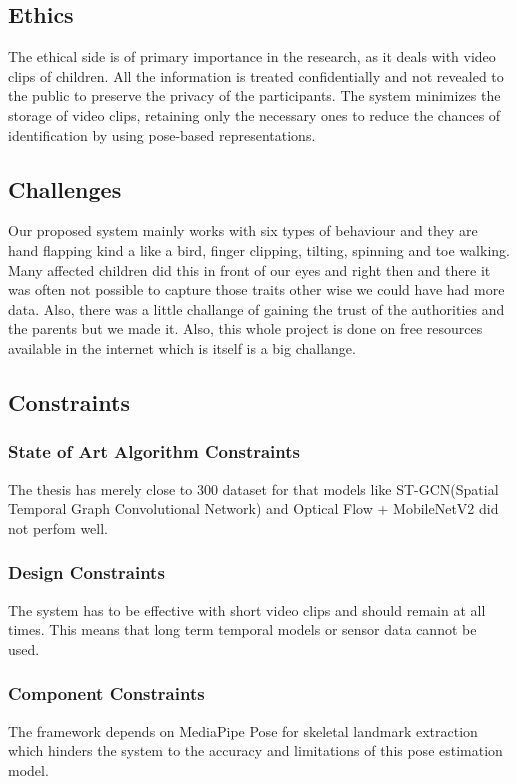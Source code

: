 \subsection{Ethics}

The ethical side is of primary importance in the research, as it deals with video clips of children. All the information is treated confidentially and not revealed to the public to preserve the privacy of the participants. The system minimizes the storage of video clips, retaining only the necessary ones to reduce the chances of identification by using pose-based representations.

\subsection{Challenges}

Our proposed system mainly works with six types of behaviour and they are hand flapping kind a like a bird, finger clipping, tilting, spinning and toe walking. Many affected children did this in front of our eyes and right then and there it was often not possible to capture those traits other wise we could have had more data. Also, there was a little challange of gaining the trust of the authorities and the parents but we made it. Also, this whole project is done on free resources available in the internet which is itself is a big challange.

\subsection{Constraints}

\subsubsection{State of Art Algorithm Constraints}
The thesis has merely close to 300 dataset for that models like ST-GCN(Spatial Temporal Graph Convolutional Network) and Optical Flow + MobileNetV2 did not perfom well.
\subsubsection{Design Constraints}
The system has to be effective with short video clips and should remain at all times. This means that long term temporal models or sensor data cannot be used.

\subsubsection{Component Constraints}
The framework depends on MediaPipe Pose for skeletal landmark extraction which hinders the system to the accuracy and limitations of this pose estimation model.

